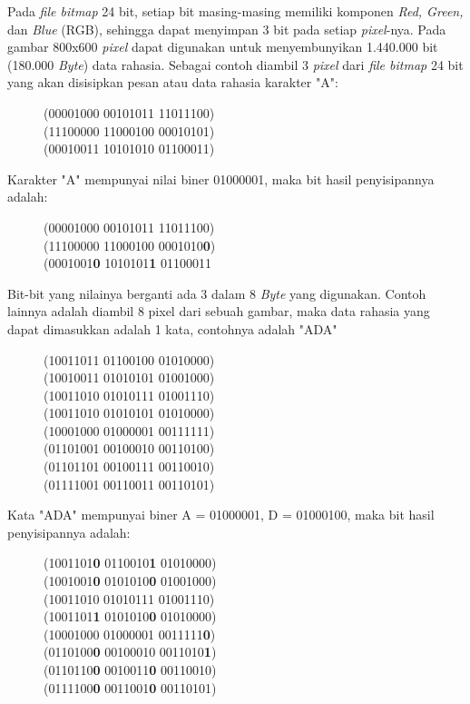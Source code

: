 Pada \emph{file bitmap} 24 bit, setiap bit masing-masing memiliki komponen \emph{Red, Green,} dan \emph{Blue} (RGB), sehingga dapat menyimpan 3 bit pada setiap \emph{pixel}-nya. Pada gambar 800x600 \emph{pixel} dapat digunakan untuk menyembunyikan 1.440.000 bit (180.000 \emph{Byte}) data rahasia. Sebagai contoh diambil 3 \emph{pixel} dari \emph{file bitmap} 24 bit yang akan disisipkan pesan atau data rahasia karakter "A":
\begin{figure}[H]
	\centering
	(00001000 00101011 11011100)\\
	(11100000 11000100 00010101)\\
	(00010011 10101010 01100011)\\
\end{figure}

Karakter "A" mempunyai nilai biner 01000001, maka bit hasil penyisipannya adalah:
\begin{figure}[H]
	\centering
	(00001000 00101011 11011100)\\
	(11100000 11000100 0001010\textbf{0})\\
	(0001001\textbf{0} 1010101\textbf{1} 01100011\\
\end{figure}

Bit-bit yang nilainya berganti ada 3 dalam 8 \emph{Byte} yang digunakan. Contoh lainnya adalah diambil 8 pixel dari sebuah gambar, maka data rahasia yang dapat dimasukkan adalah 1 kata, contohnya adalah "ADA"
\begin{figure}[H]
	\centering
	(10011011 01100100 01010000)\\
	(10010011 01010101 01001000)\\
	(10011010 01010111 01001110)\\
	(10011010 01010101 01010000)\\
	(10001000 01000001 00111111)\\
	(01101001 00100010 00110100)\\
	(01101101 00100111 00110010)\\
	(01111001 00110011 00110101)\\
\end{figure}

Kata "ADA" mempunyai biner A = 01000001, D = 01000100, maka bit hasil penyisipannya adalah:
\begin{figure}[H]
	\centering
	(1001101\textbf{0} 0110010\textbf{1} 01010000)\\
	(1001001\textbf{0} 0101010\textbf{0} 01001000)\\
	(10011010 01010111 01001110)\\
	(1001101\textbf{1} 0101010\textbf{0} 01010000)\\
	(10001000 01000001 0011111\textbf{0})\\
	(0110100\textbf{0} 00100010 0011010\textbf{1})\\
	(0110110\textbf{0} 0010011\textbf{0} 00110010)\\
	(0111100\textbf{0} 0011001\textbf{0} 00110101)\\
\end{figure}

